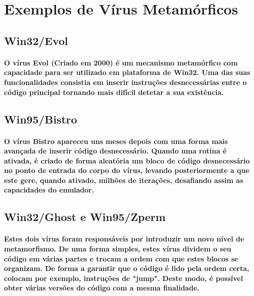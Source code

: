 \documentclass[runningheads]{llncs}
\begin{document}
\section{Exemplos de Vírus Metamórficos}

\subsection{Win32/Evol}

\paragraph{O vírus Evol (Criado em 2000) é um mecanismo metamórfico com capacidade para ser utilizado em plataforma de Win32. Uma das suas funcionalidades consistia em inserir instruções desnecessárias entre o código principal tornando mais difícil detetar a sua existência. }\cite{3}

\subsection{Win95/Bistro}

\paragraph{O vírus Bistro apareceu uns meses depois com uma forma mais avançada de inserir código desnecessário. Quando uma rotina é ativada, é criado de forma aleatória um bloco de código desnecessário no ponto de entrada do corpo do vírus, levando posteriormente a que este gere, quando ativado, milhões de iterações, desafiando assim as capacidades do emulador. }\cite{3}

\subsection{Win32/Ghost e Win95/Zperm}

\paragraph{Estes dois vírus foram responsáveis por introduzir um novo nível de metamorfismo. De uma forma simples, estes vírus dividem o seu código em várias partes e trocam a ordem com que estes blocos se organizam. De forma a garantir que o código é lido pela ordem certa, colocam por exemplo, instruções de "jump". Deste modo, é possível obter várias versões do código com a mesma finalidade.}\cite{3}
\end{document}
